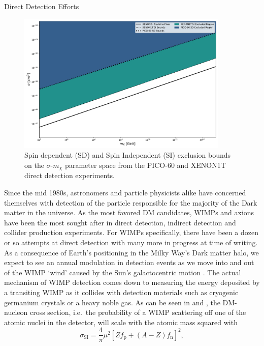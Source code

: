 \documentclass[a4paper,11pt]{article}
\begin{document}
\begin{section}{Direct Detection Efforts}
    \begin{figure}
        \centering
        \includegraphics[width=0.9\textwidth]{bounds.pdf}
        \caption{Spin dependent (SD) and Spin Independent (SI) exclusion bounds on the $\sigma$\--$m_\chi$ parameter space from the PICO-60 and XENON1T direct detection experiments.}
        \label{bounds}
    \end{figure}
    Since the mid 1980s, astronomers and particle physicists alike have concerned themselves with detection of the particle responsible for the majority of the Dark matter in the universe.
    As the most favored DM candidates, WIMPs and axions have been the most sought after in direct detection, indirect detection and collider production experiments.
    For WIMPs specifically, there have been a dozen or so attempts at direct detection with many more in progress at time of writing.
    As a consequence of Earth's positioning in the Milky Way's Dark matter halo, we expect to see an annual modulation in detection events as we move into and out of the WIMP `wind' caused by the Sun's galactocentric motion \cite{Drunkier:1986}.
    The actual mechanism of WIMP detection comes down to measuring the energy deposited by a transiting WIMP as it collides with detection materials such as cryogenic germanium crystals or a heavy noble gas.
    As can be seen in \cite{Drunkier:1986} and \cite{Freese:2013}, the DM-nucleon cross section, i.e.~the probability of a WIMP scattering off one of the atomic nuclei in the detector, will scale with the atomic mass squared with
    \begin{equation}
        \sigma_{\mathrm{SI}}=\frac{4}{\pi} \mu^{2}\left[Z f_{\mathrm{p}}+(A-Z) f_{\mathrm{n}}\right]^{2},

\end{equation}
\end{section}
\end{document}
